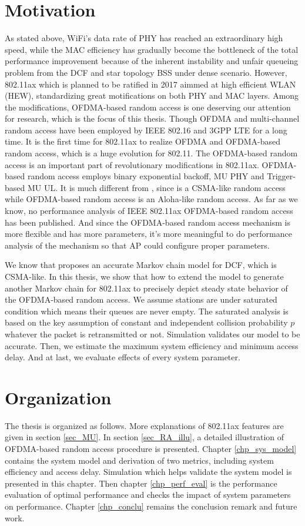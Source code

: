 \section{Motivation}
As stated above, WiFi's data rate of PHY has reached an extraordinary high speed, while the MAC efficiency has gradually become the bottleneck of the total performance improvement because of the inherent instability and unfair queueing problem from the DCF and star topology BSS under dense scenario.
However, 802.11ax which is planned to be ratified in 2017 aimmed at high efficient WLAN (HEW), standardizing great motifications on both PHY and MAC layers. 
Among the modifications, OFDMA-based random access is one deserving our attention for research, which is the focus of this thesis. 
Though OFDMA and multi-channel random access have been employed by IEEE 802.16 and 3GPP LTE for a long time.
It is the first time for 802.11ax to realize OFDMA and OFDMA-based random access, which is a huge evolution for 802.11.
The OFDMA-based random access is an important part of revolutionary modifications in 802.11ax. 
OFDMA-based random access employs binary exponential backoff, MU PHY and Trigger-based MU UL.
It is much different from \cite{GeneralizedOFDMACSMACA}, since \cite{GeneralizedOFDMACSMACA} is a CSMA-like random access while OFDMA-based random access is an Aloha-like random access.
As far as we know, no performance analysis of IEEE 802.11ax OFDMA-based random access has been published. 
And since the OFDMA-based random access mechanism is more flexible and has more parameters, it's more meaningful to do performance analysis of the mechanism so that AP could configure proper parameters.

We know that \cite{bianchi2000performance} proposes an accurate Markov chain model for DCF, which is CSMA-like.
In this thesis, we show that how to extend the model to generate another Markov chain for 802.11ax to precisely depict steady state behavior of the OFDMA-based random access.
We assume stations are under saturated condition which means their queues are never empty.
The saturated analysis is based on the key assumption of constant and independent collision probability $p$ whatever the packet is retransmitted or not.
Simulation validates our model to be accurate.
Then, we estimate the maximum system efficiency and minimum access delay. 
And at last, we evaluate effects of every system parameter. 

\section{Organization}
The thesis is organized as follows. 
More explanations of 802.11ax features are given in section \ref{sec_MU}. In section \ref{sec_RA_illu}, a detailed illustration of OFDMA-based random access procedure is presented.
Chapter \ref{chp_sys_model} contains the system model and derivation of two metrics, including system efficiency and access delay. 
Simulation which helps validate the system model is presented in this chapter.
Then chapter \ref{chp_perf_eval} is the performance evaluation of optimal performance and checks the impact of system parameters on performance.
Chapter \ref{chp_conclu} remains the conclusion remark and future work.
